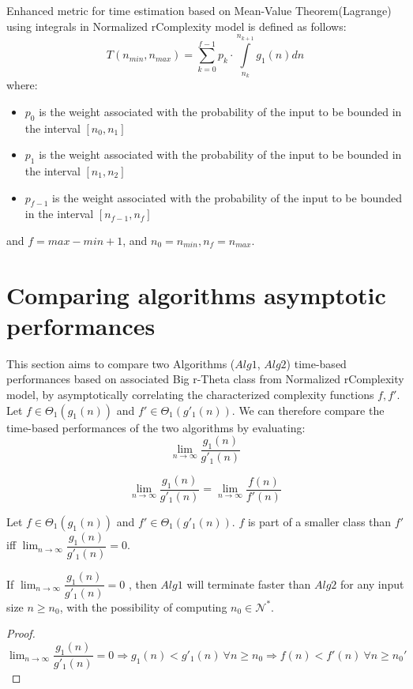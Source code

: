 \begin{definition} Enhanced metric for time estimation based on Mean-Value Theorem(Lagrange) using integrals in Normalized rComplexity model is defined as follows:
\[  T(n_{min}, n_{max}) =\sum\limits_{k=0}^{f-1} p_{k} \cdot \int\limits_{n_{k}}^{n_{k+1}} g_{1}(n) dn  \]
where:
\begin{itemize}
	\item $p_{0}$ is the weight associated with the probability of the input to be bounded in the interval $[n_{0}, n_{1}]$
	\item $p_{1}$ is the weight associated with the probability of the input to be bounded in the interval $[n_{1}, n_{2}]$
	\item $p_{f-1}$ is the weight associated with the probability of the input to be bounded in the interval $[n_{f-1}, n_{f}]$
\end{itemize}
and $f = max - min + 1$, and $n_{0} = n_{min}, n_{f} = n_{max}$.
\end{definition}

\section{Comparing algorithms asymptotic performances}


This section aims to compare two Algorithms ($Alg1$, $Alg2$) time-based performances based on associated Big r-Theta class from Normalized rComplexity model, by asymptotically correlating the characterized complexity functions $f, f'$. \\
Let $f \in \Theta_{1}(g_{1}(n))$ and $f' \in \Theta_{1}(g'_{1}(n))$.
We can therefore compare the time-based performances of the two algorithms by evaluating:  \[\lim_{n\to\infty} \dfrac{g_{1}(n)}{g'_{1}(n)}\]

\begin{remark}
\[\lim_{n\to\infty} \dfrac{g_{1}(n)}{g'_{1}(n)} = \lim_{n\to\infty} \dfrac{f(n)}{f'(n)}\]
\end{remark}

\begin{definition}
Let $f \in \Theta_{1}(g_{1}(n))$ and $f' \in \Theta_{1}(g'_{1}(n))$. $f$ is part of a smaller class than $f'$ iff $\lim_{n\to\infty} \dfrac{g_{1}(n)}{g'_{1}(n)} = 0$.
\end{definition}
\begin{lemma}
If  $ \lim_{n\to\infty} \dfrac{g_{1}(n)}{g'_{1}(n)} = 0 $ , then $Alg1$ will terminate faster than $Alg2$ for any input size $n \geq n_{0}$, with the possibility of computing $n_{0} \in \mathcal{N}^{*}$.
\end{lemma}
\begin{proof}
$\lim_{n\to\infty} \dfrac{g_{1}(n)}{g'_{1}(n)} = 0 \Rightarrow g_{1}(n) < g'_{1}(n)\ \forall n \geq n_{0} \Rightarrow f(n) < f'(n) \ \forall n \geq n_{0}'$
\end{proof}

